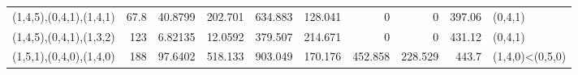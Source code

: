 \begin{tabular}{lrrrrrrrrl}
 (1,4,5),(0,4,1),(1,4,1) &       67.8 &                          40.8799  &                        202.701  &                           634.883 &                         128.041 &                             0     &                           0     &     397.06 & (0,4,1)                 \\
 (1,4,5),(0,4,1),(1,3,2) &      123   &                           6.82135 &                         12.0592 &                           379.507 &                         214.671 &                             0     &                           0     &     431.12 & (0,4,1)                 \\
 (1,5,1),(0,4,0),(1,4,0) &      188   &                          97.6402  &                        518.133  &                           903.049 &                         170.176 &                           452.858 &                         228.529 &     443.7  & (1,4,0)<(0,5,0)         \\
\hline
\end{tabular}